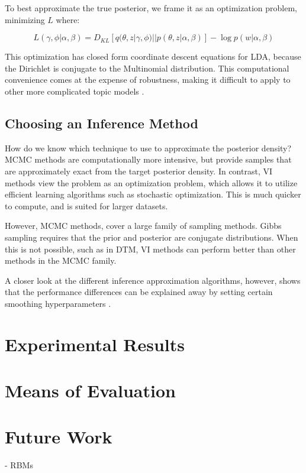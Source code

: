 \documentclass[letterpaper]{article}
\begin{document}
To best approximate the true posterior, we frame it as an optimization
problem, minimizing $L$ where:

\begin{equation}
L(\gamma, \phi | \alpha, \beta) = D_{KL}\left[ q(\theta, z | \gamma,
  \phi) || p(\theta, z | \alpha, \beta) \right] - \log p(w | \alpha, \beta)
\end{equation}

This optimization has closed form coordinate descent equations for
LDA, because the Dirichlet is conjugate to the Multinomial
distribution. This computational convenience comes at the expense of
robustness, making it difficult to apply to other more complicated
topic models \cite{blei2003latent}. 

\subsection{Choosing an Inference Method}
\label{sub:choosing-inference}
How do we know which technique to use to approximate the posterior
density? MCMC methods are computationally more intensive, but provide
samples that are approximately exact from the target posterior
density. In contrast, VI methods view the problem as an optimization
problem, which allows it to utilize efficient learning algorithms such
as stochastic optimization. This is much quicker to compute, and is
suited for larger datasets.

However, MCMC methods, cover a large family of sampling methods.
Gibbs sampling requires that the prior and posterior are conjugate
distributions. When this is not possible, such as in DTM, VI methods
can perform better than other methods in the MCMC family.

A closer look at the different inference approximation algorithms,
however, shows that the performance differences can be explained away
by setting certain smoothing hyperparameters
\cite{asuncion-2012-smoot-infer}.

\section{Experimental Results}

\section{Means of Evaluation}

\section{Future Work}
- RBMs


\end{document}
